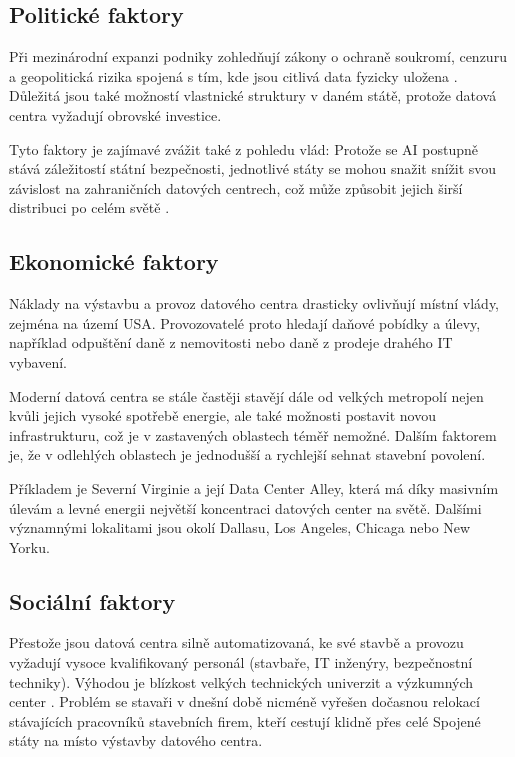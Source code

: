 \subsection{Politické faktory}
\label{subsec:pestle_po}

Při mezinárodní expanzi podniky zohledňují zákony o ochraně soukromí, cenzuru a geopolitická rizika spojená s tím, kde jsou citlivá data fyzicky uložena \cite[s. 96]{geng_data_2014}. Důležitá jsou také možností vlastnické struktury v daném státě, protože datová centra vyžadují obrovské investice.

Tyto faktory je zajímavé zvážit také z pohledu vlád: Protože se AI postupně stává záležitostí státní bezpečnosti, jednotlivé státy se mohou snažit snížit svou závislost na zahraničních datových centrech, což může způsobit jejich širší distribuci po celém světě \cite[s. 25]{pilz_compute_2023}. 

\subsection{Ekonomické faktory}
\label{subsec:pestle_ec}

Náklady na výstavbu a provoz datového centra drasticky ovlivňují místní vlády, zejména na území USA. Provozovatelé proto hledají daňové pobídky a úlevy, například odpuštění daně z nemovitosti nebo daně z prodeje drahého IT vybavení. \cite[s. 97--89]{geng_data_2014}

Moderní datová centra se stále častěji stavějí dále od velkých metropolí nejen kvůli jejich vysoké spotřebě energie, ale také možnosti postavit novou infrastrukturu, což je v zastavených oblastech téměř nemožné. Dalším faktorem je, že v odlehlých oblastech je jednodušší a rychlejší sehnat stavební povolení. \cite[s. 25]{pilz_compute_2023}

Příkladem je Severní Virginie a její Data Center Alley, která má díky masivním úlevám a levné energii největší koncentraci datových center na světě. Dalšími významnými lokalitami jsou okolí Dallasu, Los Angeles, Chicaga nebo New Yorku. \cite{pilz_compute_2023}

\subsection{Sociální faktory}
\label{subsec:pestle_so}

Přestože jsou datová centra silně automatizovaná, ke své stavbě a provozu vyžadují vysoce kvalifikovaný personál (stavbaře, IT inženýry, bezpečnostní techniky). Výhodou je blízkost velkých technických univerzit a výzkumných center \cite{geng_data_2014}. Problém se stavaři v dnešní době nicméně vyřešen dočasnou relokací stávajících pracovníků stavebních firem, kteří cestují klidně přes celé Spojené státy na místo výstavby datového centra.


